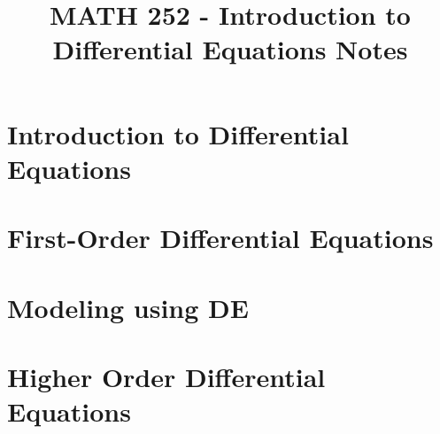 \documentclass[12pt]{report}
\title{MATH 252 - Introduction to Differential Equations Notes}
\begin{document}
\maketitle
\tableofcontents

\chapter[Introduction to Diff-Eq]{Introduction to Differential Equations}

\chapter{First-Order Differential Equations}

\chapter{Modeling using DE}

\chapter[Higher Order DEs]{Higher Order Differential Equations}\label{ch:higher-order-differential-equations}
\end{document}
